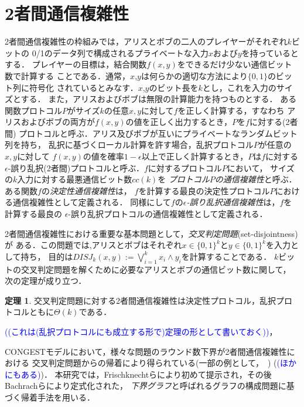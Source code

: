 \documentclass[12pt]{thesis}
\newcommand{\Izumi}[1]{\textcolor{blue}{(#1)}}
\newcommand{\CONGEST}{\textsf{CONGEST}}
\theoremstyle{definition}
\newtheorem{theorem}{定理}[chapter]
\begin{document}
\section{2者間通信複雑性}
2者間通信複雑性の枠組みでは，アリスとボブの二人のプレイヤーがそれぞれ$k$ビットの
0/1のデータ列で構成されるプライベートな入力$x$および$y$を持っているとする．
プレイヤーの目標は，結合関数$f(x,y)$をできるだけ少ない通信ビット数で計算する
ことである．通常，$x$,$y$は何らかの適切な方法により$\{0,1\}$のビット列に符号化
されているとみなす．$x$,$y$のビット長を$k$とし，これを入力のサイズとする．
また，アリスおよびボブは無限の計算能力を持つものとする．
ある関数プロトコル$P$がサイズ$k$の任意$x, y$に対して$f$を正しく計算する，すなわち
アリスおよびボブの両方が$f(x,y)$の値を正しく出力するとき，$P$を$f$に対する(2者間)
プロトコルと呼ぶ．アリス及びボブが互いにプライベートなランダムビット列を持ち，
乱択に基づくローカル計算を許す場合，乱択プロトコル$P$が任意の$x, y$に対して
$f(x,y)$の値を確率$1-\epsilon$以上で正しく計算するとき，$P$は$f$に対する
$\epsilon$-誤り乱択(2者間)プロトコルと呼ぶ．$f$に対するプロトコル$P$において，
サイズの$k$入力に対する最悪通信ビット数$\mathit{cc}(k)$を
\emph{プロトコル$P$の通信複雑性}と呼ぶ．ある関数$f$の\emph{決定性通信複雑性}は，
$f$を計算する最良の決定性プロトコル$P$における通信複雑性として定義される．
同様にして$f$の\emph{$\epsilon$-誤り乱択通信複雑性}は，$f$を計算する最良の
$\epsilon$-誤り乱択プロトコルの通信複雑性として定義される．

2者間通信複雑性における重要な基本問題として，\emph{交叉判定問題}(set-disjointness)が
ある．この問題では,アリスとボブはそれぞれ$x \in \{0, 1\}^{k}$と$y \in \{0, 1\}^{k}$を入力として持ち，
目的は$DISJ_{k} (x, y) :=\bigvee_{i = 1}^{k} x_{i} \land y_{i}$を計算することである．
$k$ビットの交叉判定問題を解くために必要なアリスとボブの通信ビット数に関して，
次の定理が成り立つ\cite{kalyanasundaram1992probabilistic}．
\begin{theorem}
交叉判定問題に対する2者間通信複雑性は決定性プロトコル，乱択プロトコルともに$\Theta(k)$である．
\end{theorem}
\Izumi{(これは(乱択プロトコルにも成立する形で)定理の形として書いておく)}，

{\CONGEST}モデルにおいて，様々な問題のラウンド数下界が2者間通信複雑性における
交叉判定問題からの帰着により得られている(一部の例として，~\cite{sarma2012distributed,fischer2018possibilities,czumaj2020detecting}) (\Izumi{ほかにもある})．
本研究では，Frischknechtら\cite{}により初めて提示され，その後Bachrachら\cite{}により定式化された，
\emph{下界グラフ}と呼ばれるグラフの構成問題に基づく帰着手法を用いる．
\end{document}
